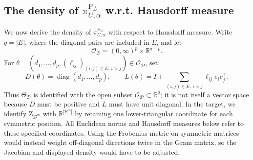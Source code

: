 \documentclass[12pt]{article}
\newcommand{\D}{\mathcal{D}}
\theoremstyle{plain}
\theoremstyle{definition}
\theoremstyle{remark}
\begin{document}
\subsection*{ The density of  $\pi_{U,\alpha}^{\mathrm{P}_{\D}}$ w.r.t. Hausdorff measure} 

We now derive the density of $\pi_{U,\alpha}^{\mathrm{P}_{\D}}$ with
respect to Hausdorff measure.  Write $q=|E|$, where the diagonal pairs are
included in $E$, and let
\[
 \mathcal O_{\D}=(0,\infty)^p\times\mathbb{R}^{q-p}.
\]
For $\theta=(d_1,\ldots,d_p,(\ell_{ij})_{(i,j)\in E,\,i>j})\in
\mathcal O_{\D}$, set
\[
 D(\theta)=\operatorname{diag}(d_1,\ldots,d_p),\qquad
 L(\theta)=I+\sum_{(i,j)\in E,\,i>j}\ell_{ij}e_i e_j^{\top}.
\]
Thus $\Theta_{\D}$ is identified with the open subset
$\mathcal O_{\D}\subset\mathbb{R}^{q}$; it is not itself a vector space
because $D$ must be positive and $L$ must have unit diagonal.  In the target,
we identify $\mathrm{Z}_{\D^{\mathrm m}}$ with
$\mathbb{R}^{|E^{\mathrm m}|}$ by retaining one lower-triangular coordinate
for each symmetric position.  All Euclidean norms and Hausdorff measures
below refer to these specified coordinates.  Using the Frobenius metric on
symmetric matrices would instead weight off-diagonal directions twice in
the Gram matrix, so the Jacobian and displayed density would have to be
adjusted.
\end{document}
